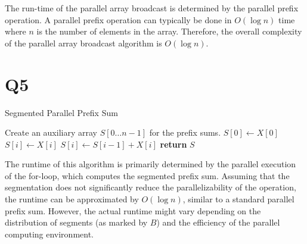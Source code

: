 \documentclass{article}
\begin{document}
The run-time of the parallel array broadcast is determined by the parallel prefix operation. A parallel prefix operation can typically be done in \( O(\log n) \) time where \( n \) is the number of elements in the array. Therefore, the overall complexity of the parallel array broadcast algorithm is \( O(\log n) \).

\section{Q5}
\begin{algorithm}[H]
\caption{Segmented Parallel Prefix Sum}
\begin{algorithmic}[1]
    \State Create an auxiliary array \(S[0\ldots n-1]\) for the prefix sums.
    \State \(S[0] \gets X[0]\)
            \State \(S[i] \gets X[i]\)
        \Else
            \State \(S[i] \gets S[i-1] + X[i]\) 
        \EndIf
    \EndFor
    \State \textbf{return} \(S\)
\EndFunction
\end{algorithmic}
\end{algorithm}

The runtime of this algorithm is primarily determined by the parallel execution of the for-loop, which computes the segmented prefix sum. Assuming that the segmentation does not significantly reduce the parallelizability of the operation, the runtime can be approximated by \(O(\log n)\), similar to a standard parallel prefix sum. However, the actual runtime might vary depending on the distribution of segments (as marked by \(B\)) and the efficiency of the parallel computing environment.
\end{document}
